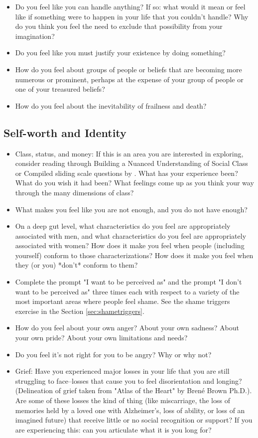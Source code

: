 \documentclass[12pt,letterpaper]{book}
\begin{document}
\begin{itemize}
    \item Do you feel like you can handle anything? If so: what would it mean or feel like if something were to happen in your life that you couldn't handle? Why do you think you feel the need to exclude that possibility from your imagination?
    \item Do you feel like you must justify your existence by doing something?
    \item How do you feel about groups of people or beliefs that are becoming more numerous or prominent, perhaps at the expense of your group of people or one of your treasured beliefs?
    \item How do you feel about the inevitability of frailness and death?
\end{itemize}

\subsection*{Self-worth and Identity}
\begin{itemize}
    \item Class, status, and money: If this is an area you are interested in exploring, consider reading through Building a Nuanced Understanding of Social Class or Compiled sliding scale questions by \textcite{harperClass} . What has your experience been? What do you wish it had been? What feelings come up as you think your way through the many dimensions of class?
    \item  What makes you feel like you are not enough, and you do not have enough?
    \item  On a deep gut level, what characteristics do you feel are appropriately associated with men, and what characteristics do you feel are appropriately associated with women? How does it make you feel when people (including yourself) conform to those characterizations? How does it make you feel when they (or you) *don't* conform to them?
    \item  Complete the prompt "I want to be perceived as" and the prompt "I don't want to be perceived as" three times each with respect to a variety of the most important areas where people feel shame. See the shame triggers exercise in the Section \ref{sec:shametriggers}.
    \item  How do you feel about your own anger? About your own sadness? About your own pride? About your own limitations and needs?
    \item  Do you feel it's not right for you to be angry? Why or why not?
    \item  Grief: Have you experienced major losses in your life that you are still struggling to face–losses that cause you to feel disorientation and longing? (Delineation of grief taken from "Atlas of the Heart" by Brené Brown Ph.D.). Are some of these losses the kind of thing (like miscarriage, the loss of memories held by a loved one with Alzheimer's, loss of ability, or loss of an imagined future) that receive little or no social recognition or support? If you are experiencing this: can you articulate what it is you long for?
\end{itemize}
\end{document}
